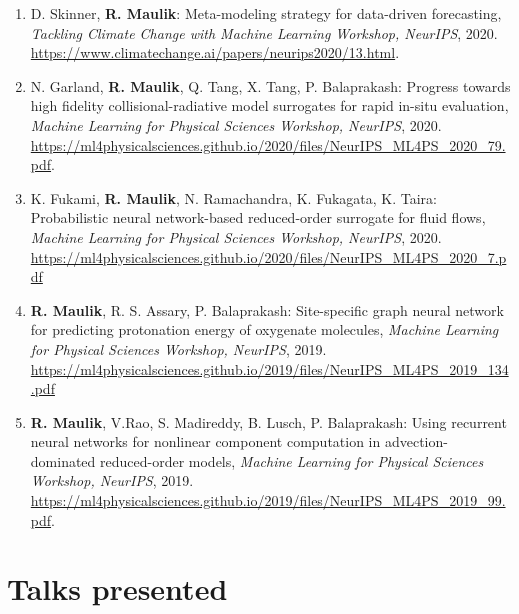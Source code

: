 \documentclass[letterpaper]{article}
\begin{document}
\begin{enumerate}

\item D. Skinner, \textbf{R. Maulik}: Meta-modeling strategy for data-driven forecasting, \textit{Tackling Climate Change with Machine Learning Workshop, NeurIPS}, 2020. \url{https://www.climatechange.ai/papers/neurips2020/13.html}. 

\item N. Garland, \textbf{R. Maulik}, Q. Tang, X. Tang, P. Balaprakash: Progress towards high fidelity collisional-radiative model surrogates for rapid in-situ evaluation, \textit{Machine Learning for Physical Sciences Workshop, NeurIPS}, 2020. \url{https://ml4physicalsciences.github.io/2020/files/NeurIPS_ML4PS_2020_79.pdf}.

\item K. Fukami, \textbf{R. Maulik}, N. Ramachandra, K. Fukagata, K. Taira: Probabilistic neural network-based reduced-order surrogate for fluid flows, \textit{Machine Learning for Physical Sciences Workshop, NeurIPS}, 2020. \url{https://ml4physicalsciences.github.io/2020/files/NeurIPS_ML4PS_2020_7.pdf}

\item \textbf{R. Maulik}, R. S. Assary, P. Balaprakash: Site-specific graph neural network for predicting protonation energy of oxygenate molecules, {\it Machine Learning for Physical Sciences Workshop, NeurIPS}, 2019. \url{https://ml4physicalsciences.github.io/2019/files/NeurIPS_ML4PS_2019_134.pdf}

\item \textbf{R. Maulik}, V.Rao, S. Madireddy, B. Lusch, P. Balaprakash: Using recurrent neural networks for nonlinear component computation in advection-dominated reduced-order models, \textit{Machine Learning for Physical Sciences Workshop, NeurIPS}, 2019. \url{https://ml4physicalsciences.github.io/2019/files/NeurIPS_ML4PS_2019_99.pdf}.

\end{enumerate}



\section*{Talks presented}
\end{document}
